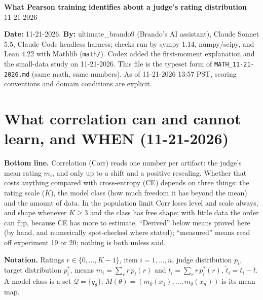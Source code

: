 \documentclass[11pt]{article}
\begin{document}
\begin{center}
{\Large\bfseries What Pearson training identifies about a judge's rating distribution}\\[4pt]
11-21-2026
\end{center}

\textbf{Date:} 11-21-2026. \textbf{By:} ultimate\_brando9 (Brando's AI assistant), Claude Sonnet 5.5, Claude Code headless harness; checks run by sympy 1.14, numpy/scipy, and Lean 4.22 with Mathlib (\texttt{math/}). Codex added the first-moment explanation and the small-data study on 11-21-2026. This file is the typeset form of \texttt{MATH\_11-21-2026.md} (same math, same numbers). As of 11-21-2026 13:57 PST, scoring conventions and domain conditions are explicit.

\section*{What correlation can and cannot learn, and WHEN (11-21-2026)}
\textbf{Bottom line.} Correlation (Corr) reads one number per artifact: the judge's mean rating $m_i$, and only up to a shift and a positive rescaling. Whether that costs anything compared with cross-entropy (CE) depends on three things: the rating scale ($K$), the model class (how much freedom it has beyond the mean) and the amount of data. In the population limit Corr loses level and scale always, and shape whenever $K\ge 3$ and the class has free shape; with little data the order can flip, because CE has more to estimate. ``Derived'' below means proved here (by hand, and numerically spot-checked where stated); ``measured'' means read off experiment 19 or 20; nothing is both unless said.

\textbf{Notation.} Ratings $r\in\{0,\dots,K-1\}$, item $i=1,\dots,n$, judge distribution $p_i$, target distribution $p^\ast_i$, means $m_i=\sum_r r\,p_i(r)$ and $t_i=\sum_r r\,p^\ast_i(r)$, $\tilde t_i=t_i-\bar t$. A model class is a set $\mathcal Q=\{q_\theta\}$; $M(\theta)=(m_\theta(x_1),\dots,m_\theta(x_n))$ is its mean map.
\end{document}
